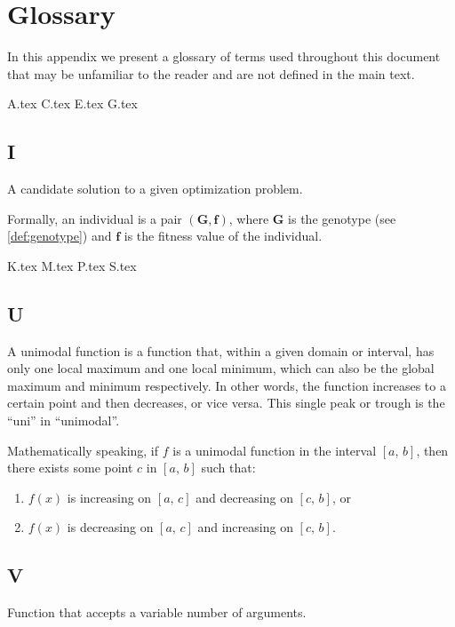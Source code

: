 \chapter{Glossary}
\label{appendix:glossary}
  In this appendix we present a glossary of terms used throughout this document 
  that may be unfamiliar to the reader and are not defined in the main text.

  {A.tex}
  {C.tex}
  {E.tex}
  {G.tex}

  \section*{I}
    \begin{definition}[Individual]
    \label{def:individual}
      A candidate solution to a given optimization problem.

      Formally, an individual is a pair \((\mathbf{G}, \mathbf{f})\), where \(\mathbf{G}\) is the
      genotype (see \vref{def:genotype}) and \(\mathbf{f}\) is the fitness value of the
      individual.
    \end{definition}
    
  {K.tex}
  {M.tex}
  {P.tex}
  {S.tex}

  \section*{U}
    \begin{definition}
    \label{def:unimodal_function}
      A unimodal function is a function that, within a given domain or interval,
      has only one local maximum and one local minimum, which can also be the
      global maximum and minimum respectively.
      In other words, the function increases to a certain point and then 
      decreases, or vice versa.
      This single peak or trough is the \enquote{uni} in \enquote{unimodal}.

      Mathematically speaking, if \(f\) is a unimodal function in the interval 
      \([a,\, b]\), then there exists some point \(c\) in \([a,\, b]\) such 
      that:

      \begin{enumerate}
        \item \(f(x)\) is increasing on \([a,\, c]\) and decreasing on \([c,\, 
          b]\), or
        \item \(f(x)\) is decreasing on \([a,\, c]\) and increasing on \([c,\,
          b]\).
      \end{enumerate}
    \end{definition}

  \section*{V}
    \begin{definition}
    \label{def:variadic_function}
      Function that accepts a variable number of arguments.
    \end{definition}
